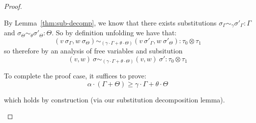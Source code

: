 \begin{proof}
\begin{description}
\begin{description}
          By Lemma~\ref{thm:sub-decomp}, we know that there exists substitutions
          $\sigma_{\Gamma} \sim_{\gamma} \sigma'_{\Gamma} : \Gamma$
          and
          $\sigma_{\Theta} \sim_{\theta} \sigma'_{\Theta} : \Theta$.
          So by definition unfolding we have that:
          $$
          (v~\sigma_{\Gamma}, w~\sigma_{\Theta}) 
            \sim_{(\gamma \cdot \Gamma + \theta \cdot \Theta)} 
          (v~\sigma'_{\Gamma}, w~\sigma'_{\Theta})
          : \tau_0 \otimes \tau_1
          $$
          so therefore by an analysis of free variables and subsitution
          $$
          (v, w)~\sigma 
            \sim_{(\gamma \cdot \Gamma + \theta \cdot \Theta)} 
          (v, w)~\sigma'
          : \tau_0 \otimes \tau_1
          $$

          To complete the proof case, it suffices to prove:
          $$\alpha \cdot (\Gamma + \Theta) \geq \gamma \cdot \Gamma + \theta \cdot \Theta$$

          which holds by construction (via our substitution decomposition lemma).
      \end{description}

  \end{description}
\end{proof}

%
